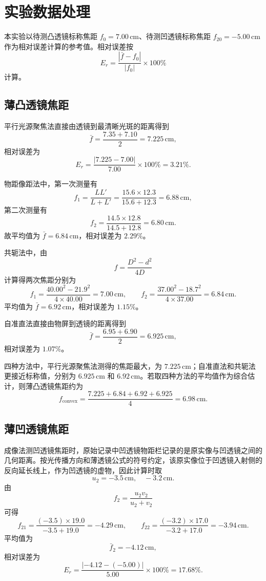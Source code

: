 \documentclass{../template/myrpt}
\begin{document}
\section{实验数据处理}

本实验以待测凸透镜标称焦距 $f_0=7.00\,\mathrm{cm}$、待测凹透镜标称焦距 $f_{20}=-5.00\,\mathrm{cm}$ 作为相对误差计算的参考值。相对误差按
\[
  E_r = \frac{\left|\bar{f}-f_0\right|}{\left|f_0\right|}\times 100\%
\]
计算。

\subsection{薄凸透镜焦距}

平行光源聚焦法直接由透镜到最清晰光斑的距离得到
\[
  \bar{f}=\frac{7.35+7.10}{2}=7.225\,\mathrm{cm},
\]
相对误差为
\[
  E_r=\frac{|7.225-7.00|}{7.00}\times 100\%=3.21\%.
\]

物距像距法中，第一次测量有
\[
  f_1=\frac{LL'}{L+L'}=\frac{15.6\times 12.3}{15.6+12.3}=6.88\,\mathrm{cm},
\]
第二次测量有
\[
  f_2=\frac{14.5\times 12.8}{14.5+12.8}=6.80\,\mathrm{cm}.
\]
故平均值为 $\bar{f}=6.84\,\mathrm{cm}$，相对误差为 $2.29\%$。

共轭法中，由
\[
  f=\frac{D^2-d^2}{4D}
\]
计算得两次焦距分别为
\[
  f_1=\frac{40.00^2-21.9^2}{4\times 40.00}=7.00\,\mathrm{cm},
  \qquad
  f_2=\frac{37.00^2-18.7^2}{4\times 37.00}=6.84\,\mathrm{cm}.
\]
平均值为 $\bar{f}=6.92\,\mathrm{cm}$，相对误差为 $1.15\%$。

自准直法直接由物屏到透镜的距离得到
\[
  \bar{f}=\frac{6.95+6.90}{2}=6.925\,\mathrm{cm},
\]
相对误差为 $1.07\%$。

四种方法中，平行光源聚焦法测得的焦距最大，为 $7.225\,\mathrm{cm}$；自准直法和共轭法更接近标称值，分别为 $6.925\,\mathrm{cm}$ 和 $6.92\,\mathrm{cm}$。若取四种方法的平均值作为综合估计，则薄凸透镜焦距约为
\[
  f_{\mathrm{convex}}=\frac{7.225+6.84+6.92+6.925}{4}=6.98\,\mathrm{cm}.
\]

\subsection{薄凹透镜焦距}

成像法测凹透镜焦距时，原始记录中凹透镜物距栏记录的是原实像与凹透镜之间的几何距离。按光传播方向和薄透镜公式的符号约定，该原实像位于凹透镜入射侧的反向延长线上，作为凹透镜的虚物，因此计算时取
\[
  u_2=-3.5\,\mathrm{cm},\quad -3.2\,\mathrm{cm}.
\]
由
\[
  f_2=\frac{u_2v_2}{u_2+v_2}
\]
可得
\[
  f_{21}=\frac{(-3.5)\times 19.0}{-3.5+19.0}=-4.29\,\mathrm{cm},
  \qquad
  f_{22}=\frac{(-3.2)\times 17.0}{-3.2+17.0}=-3.94\,\mathrm{cm}.
\]
平均值为
\[
  \bar{f}_2=-4.12\,\mathrm{cm},
\]
相对误差为
\[
  E_r=\frac{|-4.12-(-5.00)|}{5.00}\times 100\%=17.68\%.
\]
\end{document}

